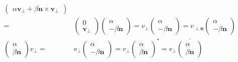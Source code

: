\documentclass[
]{book}
\theoremstyle{definition}
\theoremstyle{definition}
\theoremstyle{definition}
\theoremstyle{definition}
\theoremstyle{remark}
\begin{document}
\[\begin{aligned}
\begin{pmatrix}
\alpha\boldsymbol{v}_{{\scriptscriptstyle \perp}}+\beta\boldsymbol{n}\times\boldsymbol{v}_{{\scriptscriptstyle \perp}}
\end{pmatrix}\\
= & \begin{pmatrix}0\\
\boldsymbol{v}_{{\scriptscriptstyle \perp}}
\end{pmatrix}\begin{pmatrix}\alpha\\
-\beta\boldsymbol{n}
\end{pmatrix}=v_{{\scriptscriptstyle \perp}}\begin{pmatrix}\alpha\\
-\beta\boldsymbol{n}
\end{pmatrix}=v_{{\scriptscriptstyle \perp\boldsymbol{n}}}\begin{pmatrix}\alpha\\
-\beta\boldsymbol{n}
\end{pmatrix}\\
\begin{pmatrix}\alpha\\
\beta\boldsymbol{n}
\end{pmatrix}v_{{\scriptscriptstyle \perp}}= & v_{{\scriptscriptstyle \perp}}\begin{pmatrix}\alpha\\
-\beta\boldsymbol{n}
\end{pmatrix}=v_{{\scriptscriptstyle \perp}}\begin{pmatrix}\alpha\\
\beta\boldsymbol{n}
\end{pmatrix}^{*}=v_{{\scriptscriptstyle \perp}}\overline{\begin{pmatrix}\alpha\\
\beta\boldsymbol{n}
\end{pmatrix}}
\end{aligned}
\]
\end{document}

